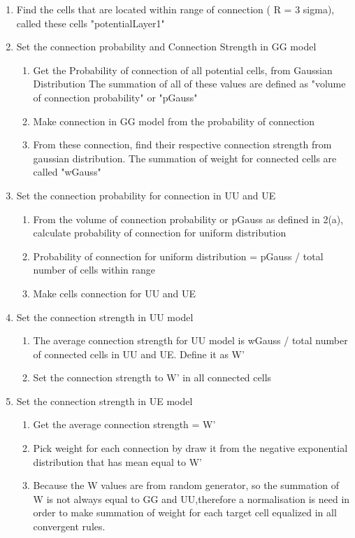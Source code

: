 \begin{enumerate}
 \item Find the cells that are located within range of connection ( R = 3 sigma), called  these cells "potentialLayer1"
 \item Set the connection probability and Connection Strength in GG model
 \begin{enumerate}
   \item Get the Probability of connection of all potential cells, from Gaussian Distribution
   The summation of all of these values  are defined as  "volume of connection probability" or  "pGauss"
   \item Make connection in GG model from the probability of connection 
   \item From these connection, find their respective connection strength from gaussian distribution.
   The summation of weight for connected cells are called "wGauss"
   
    \end{enumerate}
 \item Set the connection probability for connection in UU and UE
  \begin{enumerate}
  \item From the volume of connection probability or pGauss as defined in 2(a), calculate probability of connection for uniform distribution
   \item Probability of connection for uniform distribution = pGauss / total number of cells within range 
   \item Make cells connection for UU and UE 
  \end{enumerate}
 \item Set the connection strength in UU model
  \begin{enumerate}
 \item The average connection strength for UU model is  wGauss / total number of connected cells in UU and UE. Define it as W'
\item Set the connection strength to W' in all connected cells

  \end{enumerate}

 \item Set the connection strength in UE model
   \begin{enumerate}
   \item Get the average connection strength = W'
   \item Pick weight for each connection by draw it from the negative exponential distribution that has mean equal to W'
   \item  Because the W values are from random generator, so the summation of W is not always equal to GG and UU,therefore a normalisation is need in order to make summation of weight for each target cell equalized in all convergent rules.

      \end{enumerate}
   \end{enumerate}


